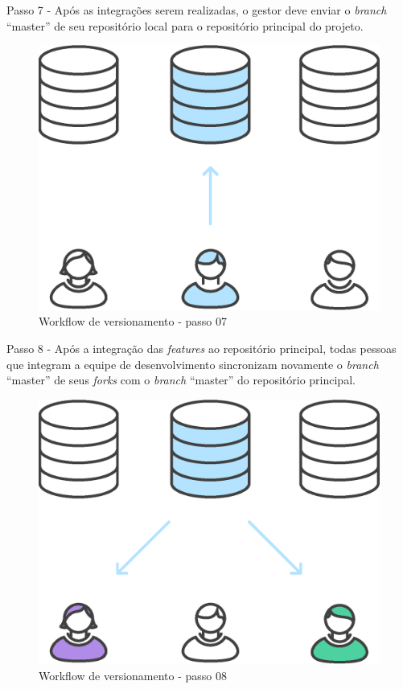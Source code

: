 Passo 7 - Após as integrações serem realizadas, o gestor deve enviar o \textit{branch} ``master'' de seu repositório local para o repositório principal do projeto.
    \begin{figure}[htb]%
        \begin{center}
            \includegraphics[scale=0.2]{./imagens/forkflow7.eps}%
        \end{center}%
        \caption{Workflow de versionamento - passo 07 \label{fig:forkflow07}}%
    \end{figure}%
\newpage
Passo 8 - Após a integração das \textit{features} ao repositório principal, todas pessoas que integram a equipe de desenvolvimento sincronizam novamente o \textit{branch} ``master'' de seus \textit{forks} com o \textit{branch} ``master'' do repositório principal.
    \begin{figure}[htb]%
        \begin{center}
            \includegraphics[scale=0.2]{./imagens/forkflow8.eps}%
        \end{center}%
        \caption{Workflow de versionamento - passo 08 \label{fig:forkflow08}}%
    \end{figure}%

